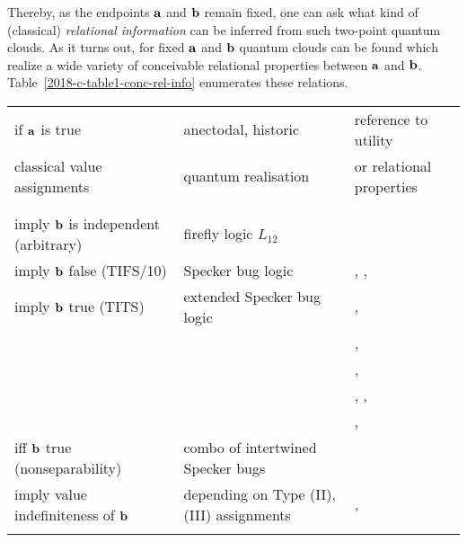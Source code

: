 \documentclass[%
  reprint,
  twocolumn,
 showpacs,
 showkeys,
 preprintnumbers,
 amsmath,amssymb,
 aps,
  prl,
  longbibliography,
 ]{revtex4-1}
\begin{document}
Thereby, as the endpoints ${\bf a}$ and ${\bf b}$ remain fixed, one can ask what kind of (classical) {\em relational information} can
be inferred from such two-point quantum clouds.
As it turns out, for fixed  ${\bf a}$ and ${\bf b}$ quantum clouds can be found which realize a wide variety
of conceivable relational properties between ${\bf a}$ and ${\bf b}$.
Table~\ref{2018-c-table1-conc-rel-info} enumerates these relations.
\begingroup
\squeezetable
\begin{table*}
 \begin{ruledtabular}
\begin{tabular}{lll}
\\
if ${\bf a}$ is true   & anectodal, historic    & reference to utility \\
classical value assignments  & quantum realisation & or relational properties \\
\\
\hline
\\
imply ${\bf b}$ is independent (arbitrary) & firefly logic $L_{12}$~\cite[pp.~21,~22]{cohen}&  \\
imply ${\bf b}$ false (TIFS/10)  & Specker bug logic~\cite[Fig.~1, p.~182]{kochen2} &   \cite[p.~588-589]{stairs83}, \cite{Yu-2012}, \cite{2018-minimalYIYS}\\
imply ${\bf b}$ true (TITS)  & extended Specker bug logic &  \cite[$\Gamma_1$, p.~68]{kochen1}, \\
&&\cite[Sects.~II,III, Fig.~1]{clifton-93}, \\
&&\cite[Fig.~C.l. p.~67]{Belinfante-73}, \\
&&\cite[p.~394]{Pitowsky-1982-subs}, \cite{Hardy-92,Hardy-93,hardy-97}, \\
&&\cite{Cabello-1995-ppks,cabello-96,cabello-97-nhvp,Badziag-2011,Cabello-2013-HP,Cabello-2013-Hardylike}, \cite{2018-minimalYIYS}\\
iff ${\bf b}$ true  (nonseparability) & combo of intertwined Specker bugs &  \cite[$\Gamma_3$, p.~70]{kochen1}\\
imply value indefiniteness of ${\bf b}$  & depending on Type (II), (III) assignments &  \cite{pitowsky:218}, \cite{2015-AnalyticKS}\\
\\
\end{tabular}
\end{ruledtabular}
\caption{Some (incomplete) history of the relational properties realizable by two-point quantum clouds.
\label{2018-c-table1-conc-rel-info}}
\end{table*}
\endgroup
\end{document}
